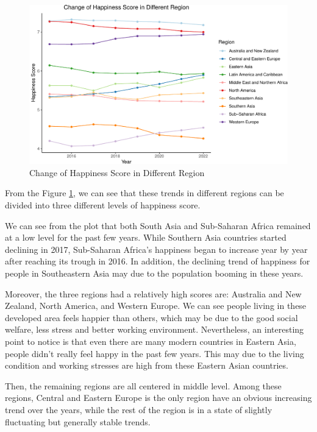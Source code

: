 \documentclass[11pt,a4paper,]{article}
\begin{document}
\begin{figure}
\centering
\includegraphics{Assignment4_files/figure-latex/trends-1.pdf}
\caption{\label{fig:trends}Change of Happiness Score in Different Region}
\end{figure}

From the Figure \ref{fig:trends}, we can see that these trends in different regions can be divided into three different levels of happiness score.

We can see from the plot that both South Asia and Sub-Saharan Africa remained at a low level for the past few years. While Southern Asia countries started declining in 2017, Sub-Saharan Africa's happiness began to increase year by year after reaching its trough in 2016. In addition, the declining trend of happiness for people in Southeastern Asia may due to the population booming in these years.

Moreover, the three regions had a relatively high scores are: Australia and New Zealand, North America, and Western Europe. We can see people living in these developed area feels happier than others, which may be due to the good social welfare, less stress and better working environment. Nevertheless, an interesting point to notice is that even there are many modern countries in Eastern Asia, people didn't really feel happy in the past few years. This may due to the living condition and working stresses are high from these Eastern Asian countries.

Then, the remaining regions are all centered in middle level. Among these regions, Central and Eastern Europe is the only region have an obvious increasing trend over the years, while the rest of the region is in a state of slightly fluctuating but generally stable trends.
\end{document}
